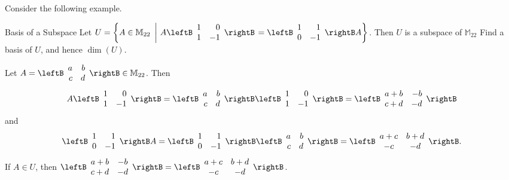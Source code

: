Consider the following example.

\begin{example}{Basis of a Subspace}\label{exa:basissubspace}
Let $U=\left\{ A\in\mathbb{M}_{22} ~\left|~
A\leftB\begin{array}{rr}
1 & 0 \\ 1 & -1 \end{array}\rightB\right. 
= \leftB\begin{array}{rr}
1 & 1 \\ 0 & -1 \end{array}\rightB A \right\}$. 
Then $U$ is a subspace of $\mathbb{M}_{22}$ 
Find a basis of $U$, and hence $\dim(U)$.
\end{example}

\begin{solution}
Let $A=\leftB\begin{array}{rr} a & b \\ c & d \end{array}\rightB
\in\mathbb{M}_{22}$.
Then
\[ A\leftB\begin{array}{rr} 1 & 0 \\ 1 & -1 \end{array}\rightB
= \leftB\begin{array}{rr} a & b \\ c & d \end{array}\rightB
\leftB\begin{array}{rr} 1 & 0 \\ 1 & -1 \end{array}\rightB
=\leftB\begin{array}{rr} a+b & -b \\ c+d & -d \end{array}\rightB\]
and
\[ \leftB\begin{array}{rr} 1 & 1 \\ 0 & -1 \end{array}\rightB A
= \leftB\begin{array}{rr} 1 & 1 \\ 0 & -1 \end{array}\rightB
\leftB\begin{array}{rr} a & b \\ c & d \end{array}\rightB
=\leftB\begin{array}{cc} a+c & b+d \\ -c & -d \end{array}\rightB.\]
If $A\in U$, then
$\leftB\begin{array}{cc} a+b & -b \\ c+d & -d \end{array}\rightB=
\leftB\begin{array}{cc} a+c & b+d \\ -c & -d \end{array}\rightB$.


\end{solution}
